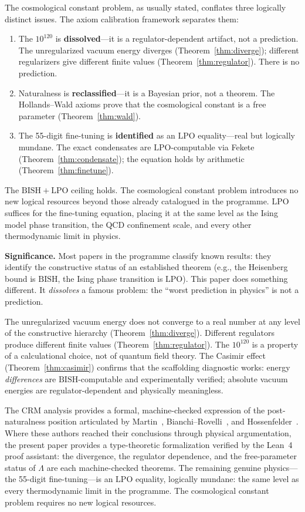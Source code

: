 \documentclass[11pt,a4paper]{article}
\theoremstyle{plain}
\theoremstyle{definition}
\newcommand{\LPO}{\ensuremath{\mathrm{LPO}}}
\newcommand{\BISH}{\ensuremath{\mathrm{BISH}}}
\begin{document}
The cosmological constant problem, as usually stated, conflates
three logically distinct issues.  The axiom calibration framework
separates them:
\begin{enumerate}[nosep]
\item The $10^{120}$ is \textbf{dissolved}---it is a
  regulator-dependent artifact, not a prediction.
  The unregularized vacuum energy diverges (Theorem~\ref{thm:diverge});
  different regularizers give different finite values
  (Theorem~\ref{thm:regulator}).  There is no prediction.
\item Naturalness is \textbf{reclassified}---it is a Bayesian
  prior, not a theorem.  The Hollands--Wald axioms prove that the
  cosmological constant is a free parameter (Theorem~\ref{thm:wald}).
\item The 55-digit fine-tuning is \textbf{identified} as an
  $\LPO$ equality---real but logically mundane.  The exact condensates
  are $\LPO$-computable via Fekete (Theorem~\ref{thm:condensate});
  the equation holds by arithmetic (Theorem~\ref{thm:finetune}).
\end{enumerate}

The $\BISH + \LPO$ ceiling holds.  The cosmological constant problem
introduces no new logical resources beyond those already catalogued
in the programme.  $\LPO$ suffices for the fine-tuning equation, placing it at the
same level as the Ising model phase transition, the QCD confinement
scale, and every other thermodynamic limit in physics.

\medskip\noindent
\textbf{Significance.}\quad
Most papers in the programme classify known results: they identify
the constructive status of an established theorem (e.g., the
Heisenberg bound is $\BISH$, the Ising phase transition is $\LPO$).
This paper does something different.  It \emph{dissolves} a famous
problem: the ``worst prediction in physics'' is not a prediction.

The unregularized vacuum energy does not converge to a real number
at any level of the constructive hierarchy
(Theorem~\ref{thm:diverge}).  Different regulators produce
different finite values (Theorem~\ref{thm:regulator}).
The $10^{120}$ is a property of a calculational choice, not of
quantum field theory.  The Casimir effect
(Theorem~\ref{thm:casimir}) confirms that the scaffolding
diagnostic works: energy \emph{differences} are $\BISH$-computable
and experimentally verified; absolute vacuum energies are
regulator-dependent and physically meaningless.

The CRM analysis provides a formal, machine-checked expression
of the post-naturalness position articulated by
Martin~\cite{Martin2012}, Bianchi--Rovelli~\cite{BianchiRovelli2010},
and Hossenfelder~\cite{Hossenfelder2019}.  Where these authors
reached their conclusions through physical argumentation, the
present paper provides a type-theoretic formalization verified by
the Lean~4 proof assistant: the divergence, the regulator
dependence, and the free-parameter status of $\Lambda$ are each
machine-checked theorems.
The remaining genuine physics---the 55-digit fine-tuning---is
an $\LPO$ equality, logically mundane: the same level as every
thermodynamic limit in the programme.  The cosmological constant
problem requires no new logical resources.
\end{document}
